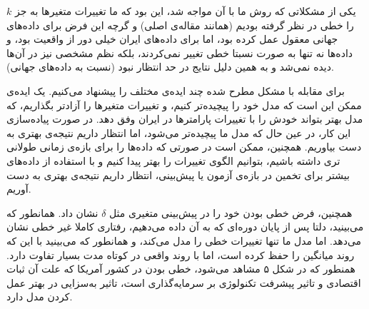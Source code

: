 \documentclass[11pt, fleqn]{article}
\begin{document}
\begin{multicols}{2}
یکی از مشکلاتی که روش ما با آن مواجه شد، این بود که ما تغییرات متغیر‌ها به جز 
$k$
 را خطی در نظر گرفته بودیم (همانند مقاله‌ی اصلی) و گرچه این فرض برای داده‌های جهانی معقول عمل کرده بود، اما برای داده‌های ایران خیلی دور از واقعیت بود، و داده‌ها نه تنها به صورت نسبتا خطی تغییر نمی‌کردند، بلکه نظم مشخصی نیز در آن‌ها دیده نمی‌شد و به همین دلیل نتایج در حد انتظار نبود (نسبت به داده‌های جهانی).


برای مقابله با مشکل مطرح شده چند ایده‌ی مختلف را پیشنهاد می‌کنیم. یک ایده‌ی ممکن این است که مدل خود را پیچیده‌تر کنیم، و تغییرات متغیر‌ها را آزادتر بگذاریم، که مدل بهتر بتواند خودش را با تغییرات پارامتر‌ها در ایران وفق دهد. در صورت پیاده‌سازی این کار، در عین حال که مدل ما پیچیده‌تر می‌شود، اما انتظار داریم نتیجه‌ی بهتری به دست بیاوریم. همچنین، ممکن است در صورتی که داده‌ها را برای بازه‌ی زمانی طولانی تری داشته باشیم، بتوانیم الگوی تغییرات را بهتر پیدا کنیم و با استفاده از داده‌های بیشتر برای تخمین در بازه‌ی آزمون یا پیش‌بینی، انتظار داریم نتیجه‌ی بهتری به دست آوریم. 


همچنین، فرض خطی بودن خود را در پیش‌بینی متغیری مثل
$\delta$
نشان داد. همانطور که می‌بینید، دلتا پس از پایان دوره‌ای که به آن داده می‌دهیم، رفتاری کاملا غیر خطی نشان می‌دهد. اما مدل ما تنها تغییرات خطی را مدل می‌کند، و همانطور که می‌بینید با این که روند میانگین را حفظ کرده است، اما با روند واقعی در کوتاه مدت بسیار تفاوت دارد. همنطور که در شکل ۵
مشاهد می‌شود،
 خطی بودن 
\lr{$\delta$}
 در کشور آمریکا که علت آن ثبات اقتصادی و تاثیر پیشرفت تکنولوژی بر سرمایه‌گذاری است، تاثیر به‌سزایی در بهتر عمل کردن مدل دارد.






\end{multicols}
\end{document}
